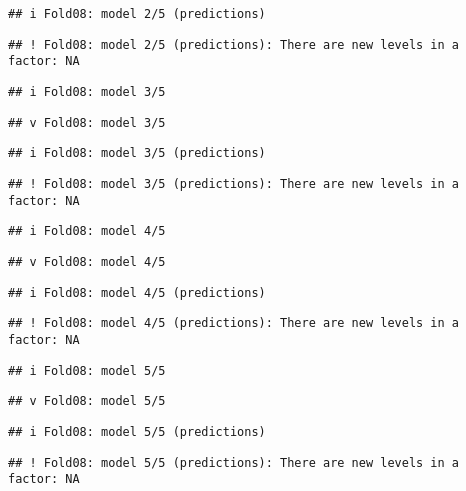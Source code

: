 \documentclass[
]{article}
\begin{document}
\begin{verbatim}
## i Fold08: model 2/5 (predictions)
\end{verbatim}

\begin{verbatim}
## ! Fold08: model 2/5 (predictions): There are new levels in a factor: NA
\end{verbatim}

\begin{verbatim}
## i Fold08: model 3/5
\end{verbatim}

\begin{verbatim}
## v Fold08: model 3/5
\end{verbatim}

\begin{verbatim}
## i Fold08: model 3/5 (predictions)
\end{verbatim}

\begin{verbatim}
## ! Fold08: model 3/5 (predictions): There are new levels in a factor: NA
\end{verbatim}

\begin{verbatim}
## i Fold08: model 4/5
\end{verbatim}

\begin{verbatim}
## v Fold08: model 4/5
\end{verbatim}

\begin{verbatim}
## i Fold08: model 4/5 (predictions)
\end{verbatim}

\begin{verbatim}
## ! Fold08: model 4/5 (predictions): There are new levels in a factor: NA
\end{verbatim}

\begin{verbatim}
## i Fold08: model 5/5
\end{verbatim}

\begin{verbatim}
## v Fold08: model 5/5
\end{verbatim}

\begin{verbatim}
## i Fold08: model 5/5 (predictions)
\end{verbatim}

\begin{verbatim}
## ! Fold08: model 5/5 (predictions): There are new levels in a factor: NA
\end{verbatim}
\end{document}

